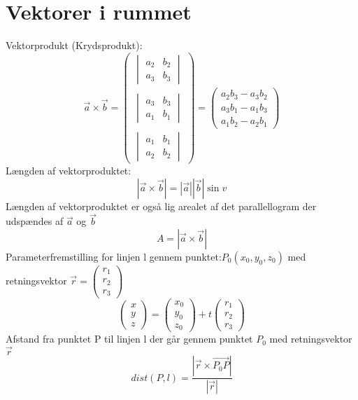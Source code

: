 \section{Vektorer i rummet}
Vektorprodukt (Krydsprodukt):
$$\vec{a}\times \vec{b} =
\begin{pmatrix}
\begin{vmatrix}a_{2}&b_{2}\\ a_{3}&b_{3}\end{vmatrix} \\
\\
\begin{vmatrix}a_{3}&b_{3}\\ a_{1}&b_{1}\end{vmatrix} \\
\\
\begin{vmatrix}a_{1}&b_{1}\\a_{2} &b_{2}\end{vmatrix} 
\end{pmatrix} =\begin{pmatrix}
a_2b_3-a_3b_2\\
a_3b_1-a_1b_3\\
a_1b_2-a_2b_1
\end{pmatrix} 
$$
Længden af vektorproduktet:
$$\left| \vec{a}\times \vec{b} \right|=\left| \vec{a}\right|\left| \vec{b} \right|\sin v$$
Længden af vektorproduktet er også lig arealet af det parallellogram der udspændes af $\vec{a}$ og $\vec{b}$
$$A=\left|\vec{a}\times \vec{b}\right|$$
Parameterfremstilling for linjen l gennem punktet:$P_0(x_0,y_0,z_0)$ med retningsvektor $\vec{r}=\begin{pmatrix}r_1 \\r_2\\r_3\end{pmatrix}$
$$\begin{pmatrix}x \\y\\z\end{pmatrix}=\begin{pmatrix}x_0 \\y_0\\z_0\end{pmatrix}+t\begin{pmatrix}r_1 \\r_2\\r_3\end{pmatrix}$$
Afstand fra punktet P til linjen l der går gennem punktet $P_0$ med retningsvektor $\vec{r}$
$$dist(P,l)=\frac{\left|\vec{r}\times \overrightarrow{P_0P}  \right|}{\left|\vec{r}\right|}$$
